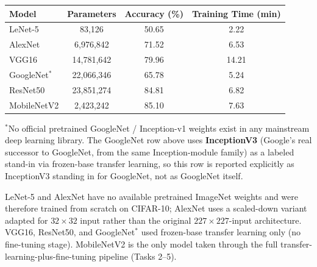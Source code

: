 \documentclass[11pt]{article}
\begin{document}
\begin{center}

\begin{tabular}{|l|c|c|c|}

\hline

Model &
Parameters &
Accuracy (\%) &
Training Time (min)\\

\hline

LeNet-5 & 83,126 & 50.65 & 2.22\\

\hline

AlexNet & 6,976,842 & 71.52 & 6.53\\

\hline

VGG16 & 14,781,642 & 79.96 & 14.21\\

\hline

GoogleNet$^{*}$ & 22,066,346 & 65.78 & 5.24\\

\hline

ResNet50 & 23,851,274 & 84.81 & 6.82\\

\hline

MobileNetV2 & 2,423,242 & 85.10 & 7.63\\

\hline

\end{tabular}

\end{center}

\vspace{2mm}

\footnotesize{$^{*}$No official pretrained GoogleNet / Inception-v1 weights
exist in any mainstream deep learning library. The GoogleNet row above uses
\textbf{InceptionV3} (Google's real successor to GoogleNet, from the same
Inception-module family) as a labeled stand-in via frozen-base transfer
learning, so this row is reported explicitly as InceptionV3 standing in for
GoogleNet, not as GoogleNet itself.}
\normalsize

\vspace{3mm}

LeNet-5 and AlexNet have no available pretrained ImageNet weights and were
therefore trained from scratch on CIFAR-10; AlexNet uses a scaled-down
variant adapted for $32\times32$ input rather than the original
$227\times227$-input architecture. VGG16, ResNet50, and GoogleNet$^{*}$ used
frozen-base transfer learning only (no fine-tuning stage). MobileNetV2 is
the only model taken through the full transfer-learning-plus-fine-tuning
pipeline (Tasks 2--5).
\end{document}
